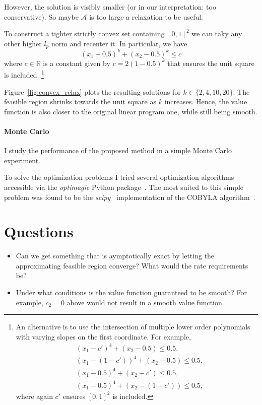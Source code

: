 \documentclass[12pt,a4paper,english]{article} %
\numberwithin{equation}{section}
\theoremstyle{definition}
\theoremstyle{remark}
\theoremstyle{plain}
\begin{document}
However, the solution is visibly smaller (or in our interpretation: too conservative).
So maybe $\mathcal{A}$ is too large a relaxation to be useful.

To construct a tighter strictly convex set containing $[0,1]^2$ we can taky any other higher $l_p$ norm and recenter it.
In particular, we have
\begin{equation*}
	(x_1-0.5)^k + (x_2-0.5)^k \leq c
\end{equation*}
where $c\in\mathbb{R}$ is a constant given by $c = 2(1-0.5)^k$ that ensures the unit square is included.
\footnote{An alternative is to use the intersection of multiple lower order polynomials with varying slopes on the first coordinate. For example,
\begin{align}
	& (x_1 - c')^4 + (x_2 - 0.5) \leq 0.5, \\
	& (x_1 - (1-c'))^4 + (x_2 - 0.5) \leq 0.5, \\
	& (x_1 - 0.5)^4 + (x_2 - c') \leq 0.5, \\
	& (x_1 - 0.5)^4 + (x_2 - (1-c')) \leq 0.5,
\end{align}
where again $c'$ ensures $[0,1]^2$ is included.}

Figure~\ref{fig:convex_relax} plots the resulting solutions for $k\in\{2,4,10, 20\}$.
The feasible region shrinks towards the unit square as $k$ increases.
Hence, the value function is also closer to the original linear program one, while still being smooth.

\paragraph{Monte Carlo}
I study the performance of the proposed method in a simple Monte Carlo experiment.

To solve the optimization problems I tried several optimization algorithms accessible via the \textit{optimagic} Python package~\citep{Gabler2024}.
The most suited to this simple problem was found to be the \textit{scipy}~\citep{scipy} implementation of the COBYLA algorithm~\citep{cobyla_powell1994direct}.

\section{Questions}

\begin{itemize}
	\item Can we get something that is aymptotically exact by letting the approximating feasible region converge? What would the rate requirements be?
	\item Under what conditions is the value function guaranteed to be smooth? For example, $c_2 = 0$ above would not result in a smooth value function.
\end{itemize}
\end{document}
